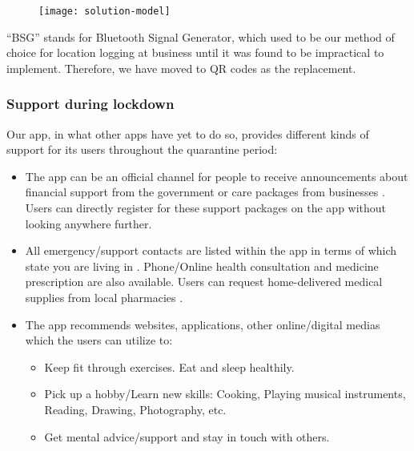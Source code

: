   \begin{figure}[H]
    \centering
    \texttt{[image: solution-model]}
  \end{figure}

  \par ``BSG'' stands for Bluetooth Signal Generator, which used to be our method of choice for location logging at business until it was found to be impractical to implement. Therefore, we have moved to QR codes as the replacement.

  \subsubsection{Support during lockdown}
  \par Our app, in what other apps have yet to do so, provides different kinds of support for its users throughout the quarantine period:
  \begin{itemize}
    \item The app can be an official channel for people to receive announcements about financial support from the government \parencite{Support5} or care packages from businesses \parencite{Support1}. Users can directly register for these support packages on the app without looking anywhere further.
    \item All emergency/support contacts are listed within the app in terms of which state you are living in \parencite{Support1} \parencite{Support2} \parencite{Support4}. Phone/Online health consultation and medicine prescription are also available. Users can request home-delivered medical supplies from local pharmacies \parencite{Support2}.
    \item The app recommends websites, applications, other online/digital medias which the users can utilize to: \parencite{Support3} \parencite{Support4}
      \begin{itemize}
        \item Keep fit through exercises. Eat and sleep healthily.
        \item Pick up a hobby/Learn new skills: Cooking, Playing musical instruments, Reading, Drawing, Photography, etc.
        \item Get mental advice/support and stay in touch with others.
      \end{itemize} 
  \end{itemize}

